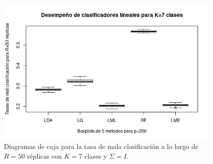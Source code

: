 \documentclass{report}
\begin{document}
\begin{figure} [h]
\begin{multicols}{2}
  		\caption*{$p=100$}
  		\includegraphics[width=\linewidth]{7_clases_p200_sigma_I}\par 
  		\caption*{$p=200$}
  		
  	\end{multicols}
  	\caption{ Diagramas de caja para la tasa de mala clasificación  a lo largo de $R=50$ réplicas con $K=7$ clases y $\Sigma=I$. }
  	\label{boxk7sigmaiden}
  \end{figure}
  
  
  
\end{document}
